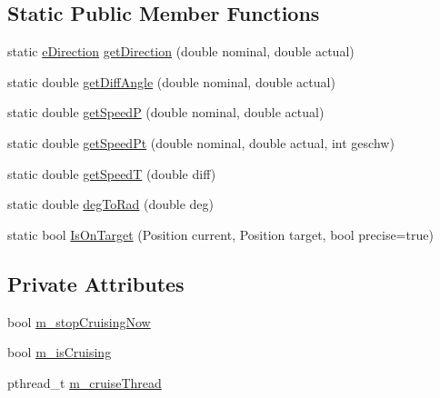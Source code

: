 \subsection*{Static Public Member Functions}
\begin{DoxyCompactItemize}
\item 
static \hyperlink{classNewRoboControl_a077fa253b827c190e82c1ce1e4c8d18f}{eDirection} \hyperlink{classNewRoboControl_a9979ccfbc622d9082fb034caf36c514b}{getDirection} (double nominal, double actual)
\item 
static double \hyperlink{classNewRoboControl_a960c714f4f8828d16dc955c871affbb5}{getDiffAngle} (double nominal, double actual)
\item 
static double \hyperlink{classNewRoboControl_ab2f2407b40c535ed734049e8e1ed71e6}{getSpeedP} (double nominal, double actual)
\item 
static double \hyperlink{classNewRoboControl_ac1f5cb8932193d5e8315bb19aeddb3fa}{getSpeedPt} (double nominal, double actual, int geschw)
\item 
static double \hyperlink{classNewRoboControl_a0c5f29bb2dee1faf96725b80ddc64398}{getSpeedT} (double diff)
\item 
static double \hyperlink{classNewRoboControl_a44def2cefef0f6c41b180bda044dfdfb}{degToRad} (double deg)
\item 
static bool \hyperlink{classNewRoboControl_a106c7ccc03f05693a07da1235ab0b17f}{IsOnTarget} (Position current, Position target, bool precise=true)
\end{DoxyCompactItemize}
\subsection*{Private Attributes}
\begin{DoxyCompactItemize}
\item 
bool \hyperlink{classNewRoboControl_a2f7afe3fa8d85f8fedf05ba12ec21f32}{m\_\-stopCruisingNow}
\item 
bool \hyperlink{classNewRoboControl_aa83c55c4b75ef04c909038e2ad581e3b}{m\_\-isCruising}
\item 
pthread\_\-t \hyperlink{classNewRoboControl_a285a033aa3238a589d78243ce7cdb620}{m\_\-cruiseThread}
\end{DoxyCompactItemize}


